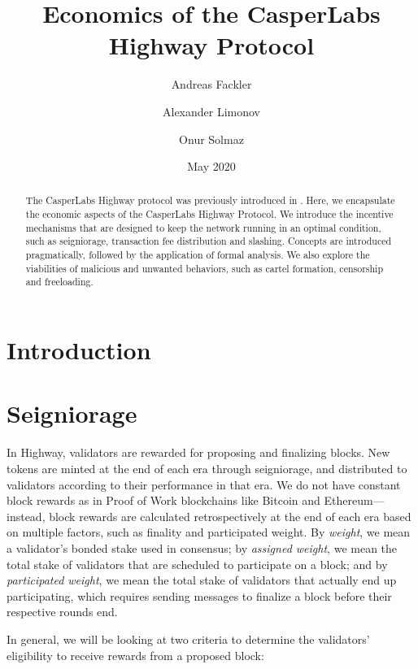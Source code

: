 \documentclass[12pt]{article}
\title{Economics of the CasperLabs Highway Protocol}
\author[*]{Andreas Fackler}
\author[*]{Alexander Limonov}
\author[*]{Onur Solmaz}
\affil[*]{CasperLabs}
\date{May 2020}
\begin{document}
\maketitle
\tableofcontents
\pagebreak


\begin{abstract}
  The CasperLabs Highway protocol was previously introduced in \cite{kane2019casperlabs}. Here, we encapsulate the economic aspects of the CasperLabs Highway Protocol. We introduce the incentive mechanisms that are designed to keep the network running in an optimal condition, such as seigniorage, transaction fee distribution and slashing. Concepts are introduced pragmatically, followed by the application of formal analysis. We also explore the viabilities of malicious and unwanted behaviors, such as cartel formation, censorship and freeloading.
\end{abstract}


\section*{Introduction}

\section{Seigniorage}


In Highway, validators are rewarded for proposing and finalizing blocks. New tokens are minted at the end of each era through seigniorage, and distributed to validators according to their performance in that era. We do not have constant block rewards as in Proof of Work blockchains like Bitcoin and Ethereum---instead, block rewards are calculated retrospectively at the end of each era based on multiple factors, such as finality and participated weight. By \emph{weight}, we mean a validator's bonded stake used in consensus; by \emph{assigned weight}, we mean the total stake of validators that are scheduled to participate on a block; and by \emph{participated weight}, we mean the total stake of validators that actually end up participating, which requires sending messages to finalize a block before their respective rounds end.

In general, we will be looking at two criteria to determine the validators' eligibility to receive rewards from a proposed block:
\end{document}
